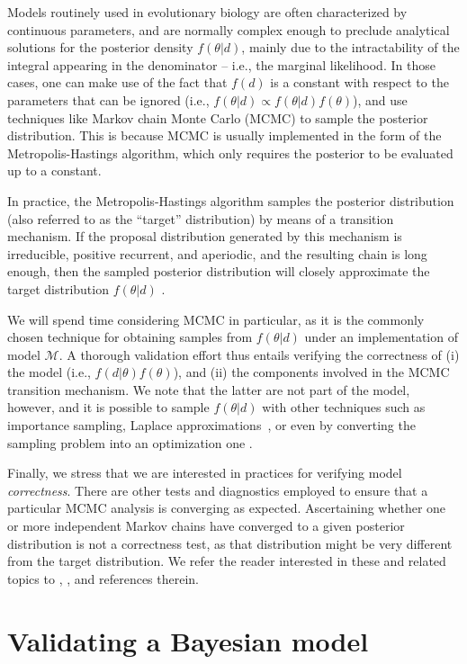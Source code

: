 \documentclass[oneside]{article}
\begin{document}
Models routinely used in evolutionary biology are often characterized by continuous parameters, and are normally complex enough to preclude analytical solutions for the posterior density $f(\theta|d)$, mainly due to the intractability of the integral appearing in the denominator -- i.e., the marginal likelihood.
In those cases, one can make use of the fact that $f(d)$ is a constant with respect to the parameters that can be ignored (i.e., $f(\theta|d) \propto f(\theta|d)f(\theta)$), and use techniques like Markov chain Monte Carlo (MCMC) to sample the posterior distribution.
This is because MCMC is usually implemented in the form of the Metropolis-Hastings \citep{metropolis53,mh} algorithm, which only requires the posterior to be evaluated up to a constant.

In practice, the Metropolis-Hastings algorithm samples the posterior
distribution (also referred to as the ``target'' distribution) by means of a
transition mechanism. 
If the proposal distribution generated by this mechanism is irreducible, positive recurrent, and aperiodic, and the resulting chain is long enough, then the sampled posterior distribution will closely approximate the target distribution $f(\theta|d)$ \citep{smith93,tierney94,gelman}.

We will spend time considering MCMC in particular, as it is the commonly chosen technique for obtaining samples from $f(\theta|d)$ under an implementation of model $\mathcal{M}$.
A thorough validation effort thus entails verifying the correctness of (i) the model (i.e., $f(d|\theta)f(\theta)$), and (ii) the components involved in the MCMC transition mechanism.
We note that the latter are not part of the model, however, and it is  possible to sample $f(\theta|d)$ with other techniques such as importance sampling, Laplace approximations~\citep{inla}, or even by converting the sampling problem into an optimization one \citep[e.g.,][]{zhang18}.

Finally, we stress that we are interested in practices for verifying model \emph{correctness}.
There are other tests and diagnostics employed to ensure that a particular MCMC analysis is converging as expected.
Ascertaining whether one or more independent Markov chains have converged to a given posterior distribution is not a correctness test, as that distribution might be very different from the target distribution. 
We refer the reader interested in these and related topics to \cite{rwty}, \cite{fabreti2022},  \cite{magee2023} and references therein.

\section*{Validating a Bayesian model}
\end{document}
